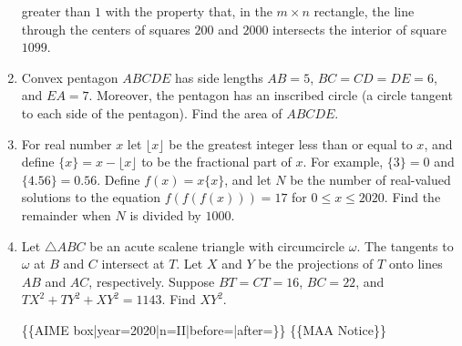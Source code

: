 \documentclass{article}
\begin{document}
\begin{enumerate}[label=\arabic*., itemsep=0.5em]
greater than \(1\) with the property that, in the \(m\times n\) rectangle, the line through the centers of squares \(200\) and \(2000\) intersects the interior of square \(1099\).\par \vspace{0.5em}\item Convex pentagon \(ABCDE\) has side lengths \(AB=5\), \(BC=CD=DE=6\), and \(EA=7\). Moreover, the pentagon has an inscribed circle (a circle tangent to each side of the pentagon). Find the area of \(ABCDE\).\par \vspace{0.5em}\item For real number \(x\) let \(\lfloor x\rfloor\) be the greatest integer less than or equal to \(x\), and define \(\{x\} = x - \lfloor x \rfloor\) to be the fractional part of \(x\). For example, \(\{3\} = 0\) and \(\{4.56\} = 0.56\). Define \(f(x)=x\{x\}\), and let \(N\) be the number of real-valued solutions to the equation \(f(f(f(x)))=17\) for \(0\leq x\leq 2020\). Find the remainder when \(N\) is divided by \(1000\).\par \vspace{0.5em}\item Let \(\triangle ABC\) be an acute scalene triangle with circumcircle \(\omega\). The tangents to \(\omega\) at \(B\) and \(C\) intersect at \(T\). Let \(X\) and \(Y\) be the projections of \(T\) onto lines \(AB\) and \(AC\), respectively. Suppose \(BT = CT = 16\), \(BC = 22\), and \(TX^2 + TY^2 + XY^2 = 1143\). Find \(XY^2\).



\{\{AIME box|year=2020|n=II|before=|after=\}\}
\{\{MAA Notice\}\}\par \vspace{0.5em}
\end{enumerate}
\end{document}
